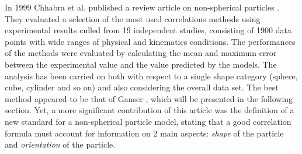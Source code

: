 %	
%	
%	 

	
	In 1999 Chhabra et al. published a review article on non-spherical particles \cite{ChhabraEtAl-1999}. They evaluated a selection of the most used correlations methods using experimental results culled from 19 independent studies, consisting of 1900 data points with wide ranges of physical and kinematics conditions.
	The performances of the methods were evaluated by calculating the mean and maximum error between the experimental value and the value predicted by the models. The analysis has been carried on both with respect to a single shape category (sphere, cube, cylinder and so on) and also considering the overall data set. 
	The best method appeared to be that of Ganser \cite{Ganser-1993}, which will be presented in the following section.
	Yet, a more significant contribution of this article was the definition
	of a new standard for a non-spherical particle model, stating that a good correlation formula must account for information on 2 main aspects: \textit{shape} of the particle and \textit{orientation} of the particle. 
	
